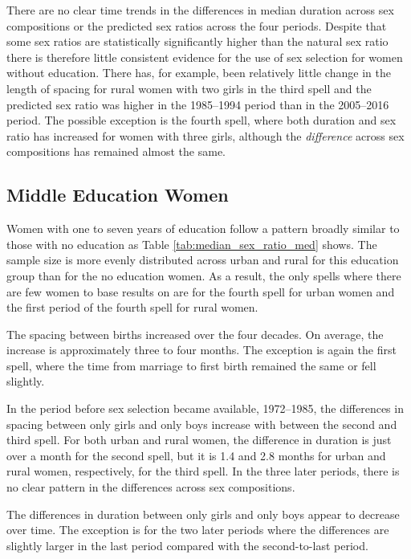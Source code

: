 \documentclass[12pt,letterpaper]{article}
\begin{document}
There are no clear time trends in the differences in median duration
across sex compositions or the predicted sex ratios across the four periods.
Despite that some sex ratios are statistically significantly higher 
than the natural sex ratio there is therefore little consistent evidence 
for the use of sex selection for women without education.
There has, for example, been relatively little change in the length
of spacing for rural women with two girls in the third spell and 
the predicted sex ratio was higher in the 1985--1994 period
than in the 2005--2016 period.
The possible exception is the fourth spell, where both duration 
and sex ratio has increased for women with three girls, although
the \emph{difference} across sex compositions has remained almost
the same.

\subsection{Middle Education Women}



Women with one to seven years of education follow a pattern
broadly similar to those with no education as 
Table \ref{tab:median_sex_ratio_med} shows.
The sample size is more evenly distributed across urban and rural 
for this education group than for the no education women.
As a result, the only spells where there are few women to base 
results on are for the fourth spell for urban women and the first 
period of the fourth spell for rural women.

The spacing between births increased over the four decades.
On average, the increase is approximately three to four months.
The exception is again the first spell, where the time from
marriage to first birth remained the same or fell slightly.

In the period before sex selection became available, 1972--1985,
the differences in spacing between only girls and only boys
increase with between the second and third spell.
For both urban and rural women, the difference in duration is just over
a month for the second spell, but it is 1.4 and 2.8 months for urban and
rural women, respectively, for the third spell.
In the three later periods, there is no clear pattern
in the differences across sex compositions.

The differences in duration between only girls and only boys 
appear to decrease over time.
The exception is for the two later periods where the
differences are slightly larger in the last period compared
with the second-to-last period. 
\end{document}
